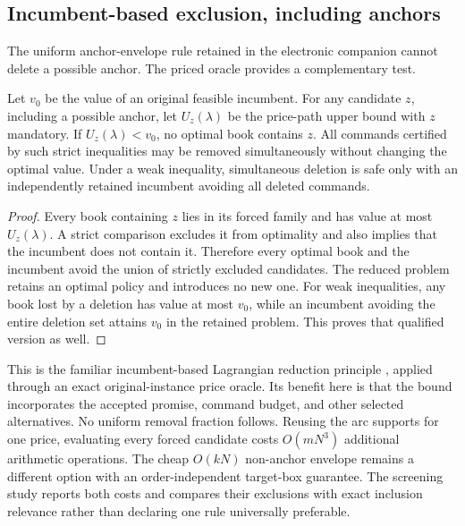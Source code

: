 \subsection{Incumbent-based exclusion, including anchors}\label{sec:anchor54}
The uniform anchor-envelope rule retained in the electronic companion cannot delete a possible anchor. The priced oracle provides a complementary test.
\begin{proposition}\label{prop:fix54}
Let $v_0$ be the value of an original feasible incumbent. For any candidate $z$, including a possible anchor, let $U_z(\lambda)$ be the price-path upper bound with $z$ mandatory. If $U_z(\lambda)<v_0$, no optimal book contains $z$. All commands certified by such strict inequalities may be removed simultaneously without changing the optimal value. Under a weak inequality, simultaneous deletion is safe only with an independently retained incumbent avoiding all deleted commands.
\end{proposition}
\begin{proof}
Every book containing $z$ lies in its forced family and has value at most $U_z(\lambda)$. A strict comparison excludes it from optimality and also implies that the incumbent does not contain it. Therefore every optimal book and the incumbent avoid the union of strictly excluded candidates. The reduced problem retains an optimal policy and introduces no new one. For weak inequalities, any book lost by a deletion has value at most $v_0$, while an incumbent avoiding the entire deletion set attains $v_0$ in the retained problem. This proves that qualified version as well.
\end{proof}

This is the familiar incumbent-based Lagrangian reduction principle \citep{BeasleyChristofides1989,Fisher1981}, applied through an exact original-instance price oracle. Its benefit here is that the bound incorporates the accepted promise, command budget, and other selected alternatives. No uniform removal fraction follows. Reusing the arc supports for one price, evaluating every forced candidate costs $O(mN^3)$ additional arithmetic operations. The cheap $O(kN)$ non-anchor envelope remains a different option with an order-independent target-box guarantee. The screening study reports both costs and compares their exclusions with exact inclusion relevance rather than declaring one rule universally preferable.
